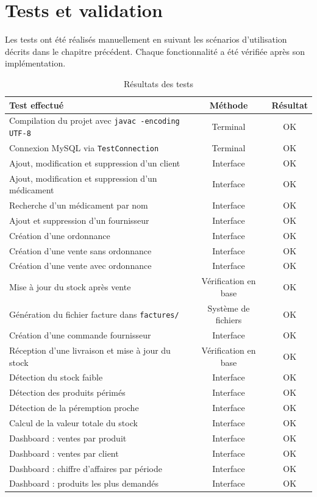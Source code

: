 \documentclass[12pt,a4paper]{report}
\begin{document}
\chapter{Tests et validation}

Les tests ont été réalisés manuellement en suivant les scénarios d'utilisation décrits dans le chapitre précédent. Chaque fonctionnalité a été vérifiée après son implémentation.

\begin{table}[H]
\centering
\begin{tabularx}{\textwidth}{Xcc}
\toprule
\textbf{Test effectué} & \textbf{Méthode} & \textbf{Résultat} \\
\midrule
Compilation du projet avec \texttt{javac -encoding UTF-8} & Terminal & OK \\
Connexion MySQL via \texttt{TestConnection} & Terminal & OK \\
Ajout, modification et suppression d'un client & Interface & OK \\
Ajout, modification et suppression d'un médicament & Interface & OK \\
Recherche d'un médicament par nom & Interface & OK \\
Ajout et suppression d'un fournisseur & Interface & OK \\
Création d'une ordonnance & Interface & OK \\
Création d'une vente sans ordonnance & Interface & OK \\
Création d'une vente avec ordonnance & Interface & OK \\
Mise à jour du stock après vente & Vérification en base & OK \\
Génération du fichier facture dans \texttt{factures/} & Système de fichiers & OK \\
Création d'une commande fournisseur & Interface & OK \\
Réception d'une livraison et mise à jour du stock & Vérification en base & OK \\
Détection du stock faible & Interface & OK \\
Détection des produits périmés & Interface & OK \\
Détection de la péremption proche & Interface & OK \\
Calcul de la valeur totale du stock & Interface & OK \\
Dashboard : ventes par produit & Interface & OK \\
Dashboard : ventes par client & Interface & OK \\
Dashboard : chiffre d'affaires par période & Interface & OK \\
Dashboard : produits les plus demandés & Interface & OK \\
\bottomrule
\end{tabularx}
\caption{Résultats des tests}
\end{table}
\end{document}
